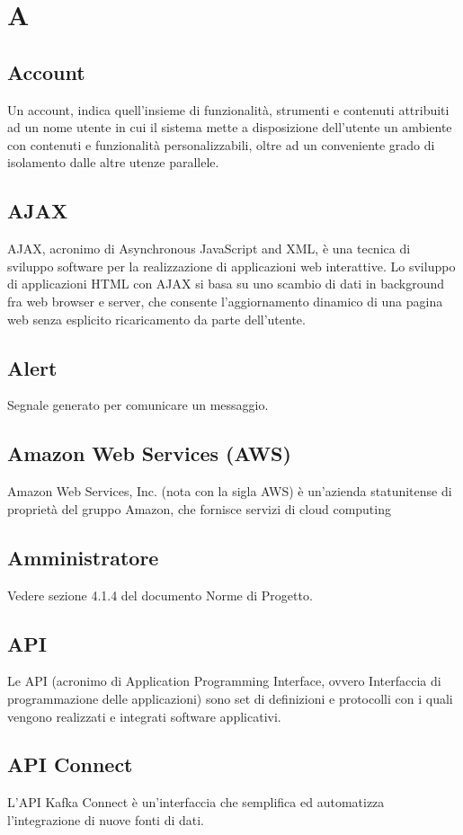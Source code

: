 
\newpage \section{A}
\subsection{Account}  Un account, indica quell'insieme di funzionalità, strumenti e contenuti attribuiti ad un nome utente in cui il sistema mette a disposizione dell'utente un ambiente con contenuti e funzionalità personalizzabili, oltre ad un conveniente grado di isolamento dalle altre utenze parallele.
\subsection{AJAX}  AJAX, acronimo di Asynchronous JavaScript and XML, è una tecnica di sviluppo software per la realizzazione di applicazioni web interattive. Lo sviluppo di applicazioni HTML con AJAX si basa su uno scambio di dati in background fra web browser e server, che consente l'aggiornamento dinamico di una pagina web senza esplicito ricaricamento da parte dell'utente.
\subsection{Alert}  Segnale generato per comunicare un messaggio.
\subsection{Amazon Web Services (AWS)}  Amazon Web Services, Inc. (nota con la sigla AWS) è un'azienda statunitense di proprietà del gruppo Amazon, che fornisce servizi di cloud computing
\subsection{Amministratore}  Vedere sezione 4.1.4 del documento Norme di Progetto.
\subsection{API}  Le API (acronimo di Application Programming Interface, ovvero Interfaccia di programmazione delle applicazioni) sono set di definizioni e protocolli con i quali vengono realizzati e integrati software applicativi.
\subsection{API Connect}  L'API Kafka Connect è un'interfaccia che semplifica ed automatizza l'integrazione di nuove fonti di dati.
